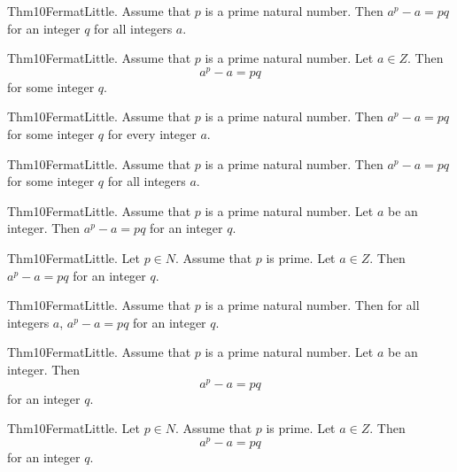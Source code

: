 \documentclass{article}
\begin{document}
Thm10FermatLittle. Assume that $p$ is a prime natural number. Then $a ^ {p}- a = p q$ for an integer $q$ for all integers $a$.

Thm10FermatLittle. Assume that $p$ is a prime natural number. Let $a \in Z$. Then $$a ^ {p}- a = p q$$ for some integer $q$.

Thm10FermatLittle. Assume that $p$ is a prime natural number. Then $a ^ {p}- a = p q$ for some integer $q$ for every integer $a$.

Thm10FermatLittle. Assume that $p$ is a prime natural number. Then $a ^ {p}- a = p q$ for some integer $q$ for all integers $a$.

Thm10FermatLittle. Assume that $p$ is a prime natural number. Let $a$ be an integer. Then $a ^ {p}- a = p q$ for an integer $q$.

Thm10FermatLittle. Let $p \in N$. Assume that $p$ is prime. Let $a \in Z$. Then $a ^ {p}- a = p q$ for an integer $q$.

Thm10FermatLittle. Assume that $p$ is a prime natural number. Then for all integers $a$, $a ^ {p}- a = p q$ for an integer $q$.

Thm10FermatLittle. Assume that $p$ is a prime natural number. Let $a$ be an integer. Then $$a ^ {p}- a = p q$$ for an integer $q$.

Thm10FermatLittle. Let $p \in N$. Assume that $p$ is prime. Let $a \in Z$. Then $$a ^ {p}- a = p q$$ for an integer $q$.
\end{document}
